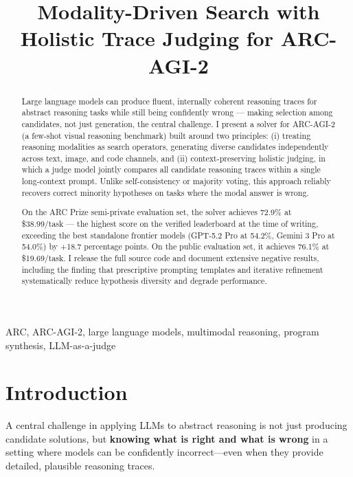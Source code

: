 \documentclass[conference]{IEEEtran}
\begin{document}
\title{Modality-Driven Search with Holistic Trace Judging for ARC-AGI-2}

\author{
}

\maketitle

\begin{abstract}
Large language models can produce fluent, internally coherent reasoning
traces for abstract reasoning tasks while still being confidently wrong
--- making selection among candidates, not just generation, the central
challenge. I present a solver for ARC-AGI-2 (a few-shot visual reasoning
benchmark) built around two principles: (i) treating reasoning
modalities as search operators, generating diverse candidates
independently across text, image, and code channels, and (ii)
context-preserving holistic judging, in which a judge model jointly
compares all candidate reasoning traces within a single long-context
prompt. Unlike self-consistency or majority voting, this approach
reliably recovers correct minority hypotheses on tasks where the modal
answer is wrong.

On the ARC Prize semi-private evaluation set, the solver achieves 72.9\%
at \$38.99/task --- the highest score on the verified leaderboard at the
time of writing, exceeding the best standalone frontier models (GPT-5.2
Pro at 54.2\%, Gemini 3 Pro at 54.0\%) by +18.7 percentage points. On
the public evaluation set, it achieves 76.1\% at \$19.69/task. I release
the full source code and document extensive negative results, including
the finding that prescriptive prompting templates and iterative
refinement systematically reduce hypothesis diversity and degrade
performance.
\end{abstract}

\begin{IEEEkeywords}
ARC, ARC-AGI-2, large language models, multimodal reasoning, program
synthesis, LLM-as-a-judge
\end{IEEEkeywords}

\section{Introduction}\label{introduction}

A central challenge in applying LLMs to abstract reasoning is not just
producing candidate solutions, but \textbf{knowing what is right and
what is wrong} in a setting where models can be confidently
incorrect---even when they provide detailed, plausible reasoning traces.
\end{document}
